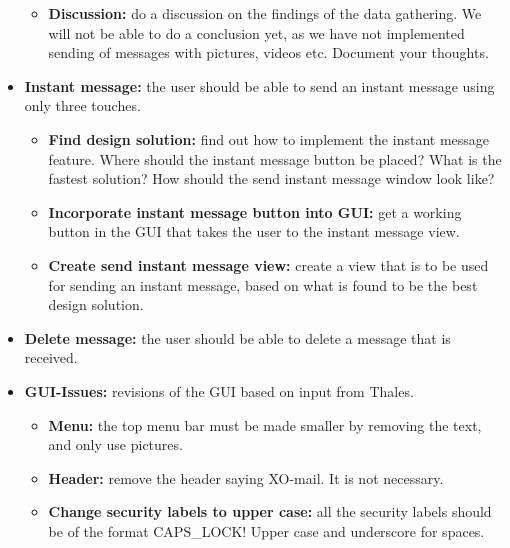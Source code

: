 \begin{itemize}
\begin{itemize}
\item{}\textbf{Discussion:} do a discussion on the findings of the data gathering. We will not be able to do a conclusion yet, as we have not implemented sending of messages with pictures, videos etc. Document your thoughts.
\end{itemize}
\item{}\textbf{Instant message:} the user should be able to send an instant message using only three touches.
\begin{itemize}
\item{}\textbf{Find design solution:} find out how to implement the instant message feature. Where should the instant message button be placed? What is the fastest solution? How should the send instant message window look like?
\item{}\textbf{Incorporate instant message button into GUI:} get a working button in the GUI that takes the user to the instant message view.
\item{}\textbf{Create send instant message view:} create a view that is to be used for sending an instant message, based on what is found to be the best design solution.
\end{itemize}
\item{}\textbf{Delete message:} the user should be able to delete a message that is received.
\item{}\textbf{GUI-Issues:} revisions of the GUI based on input from Thales.
\begin{itemize}
\item{}\textbf{Menu:} the top menu bar must be made smaller by removing the text, and only use pictures.
\item{}\textbf{Header:} remove the header saying XO-mail. It is not necessary.
\item{}\textbf{Change security labels to upper case:} all the security labels should be of the format CAPS\_LOCK! Upper case and underscore for spaces.
\end{itemize}
\end{itemize}